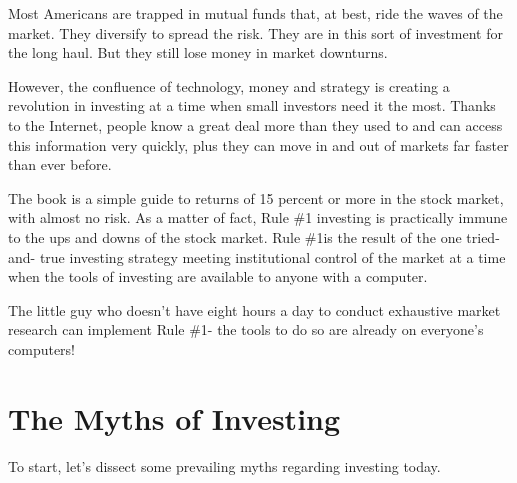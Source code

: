 \documentclass[a4paper]{jpconf}
\newcommand{\ruleone}{Rule \#1\space}
\begin{document}
Most Americans are trapped in mutual funds that, at best, ride the
waves of the market. They diversify to spread the risk. They are in
this sort of investment for the long haul. But they still lose money
in market downturns.

However, the confluence of technology, money and strategy is creating
a revolution in investing at a time when small investors need it the
most. Thanks to the Internet, people know a great deal more than they
used to and can access this information very quickly, plus they can
move in and out of markets far faster than ever before. 

The book is a simple guide to returns of 15 percent or more in the
stock market, with almost no risk. As a matter of fact, \ruleone
investing is practically immune to the ups and downs of the stock
market. \ruleone is the result of the one tried-and- true investing
strategy meeting institutional control of the market at a time when
the tools of investing are available to anyone with a computer. 

The little guy who doesn't have eight hours a day to conduct
exhaustive market research can implement \ruleone - the tools to do so
are already on everyone's computers! 

\section{The Myths of Investing}

To start, let's dissect some prevailing myths regarding investing
today.
\end{document}
